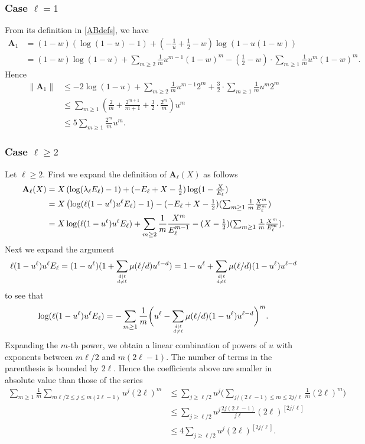 \documentclass[12pt]{amsart}
\theoremstyle{definition}
\numberwithin{equation}{section}
\newcommand{\bA}{\mathbf{A}}
\theoremstyle{definition} %
\theoremstyle{remark}
\begin{document}
\subsubsection*{Case $\ell=1$}
From its definition in \eqref{ABdefs}, we have 
\begin{align*}
\bA_1 
&=
(1-w)(\log(1-u) -1)
+(-\tfrac1u +\tfrac12 -w)\log(1-u(1-w))
\\&=
(1-w) \log(1-u)
+ \sum_{m\geq 2} \frac 1m u^{m-1}(1-w)^m
-(\tfrac 1 2-w) \cdot \sum_{m\geq 1} \frac 1m u^m (1-w)^m. 
\end{align*}
Hence
\begin{align*}
   \| \bA_1\| 
&\leq 
-2\log(1-u)
+ \sum_{m\geq 2} \frac 1m u^{m-1}2^m
+\frac32\cdot \sum_{m\geq 1} \frac 1m u^m 2^m  
\\
&\leq 
\sum_{m\geq 1}\left(\frac2m +\frac{2^{m+1}}{m+1}+ \frac32 \cdot \frac{2^m}{m}\right) u^m
\\&\leq
5\sum_{m\geq 1}\frac{2^m}{m} u^m.
\end{align*}

\subsubsection*{Case $\ell\geq 2$}
Let $\ell\geq 2$. 
First we expand the definition of $\mathbf{A}_\ell(X)$ as follows 
\begin{align}
\mathbf{A}_\ell(X) &=X\left(\log(\lambda_\ell E_\ell)-1 \right)+(-E_\ell+X-\textstyle{\frac 1 2} )\log(1-\textstyle{\frac X{E_\ell}})  \notag
\\&=
X\left(\log(\ell (1-u^\ell) u^\ell E_\ell)-1 \right)-(-E_\ell+X-\textstyle{\frac 1 2} )(\sum_{m\geq 1} \frac 1m \frac{X^m}{E_\ell^m} ) \notag
\\&=
X \log(\ell (1-u^\ell) u^\ell E_\ell)
+ \sum_{m\geq 2} \frac 1m \frac{X^m}{E_\ell^{m-1}}
-(X-\textstyle{\frac 1 2} )(\sum_{m\geq 1} \frac 1m \frac{X^m}{E_\ell^m} ). \label{al}
\end{align}
Next we expand the argument
\begin{equation} \label{arg}
    \ell (1-u^\ell) u^\ell E_\ell
    =
    (1-u^\ell)(1+\sum_{d\mid \ell\atop d\neq \ell} \mu(\ell/d) u^{\ell-d})
    =
    1-u^\ell +\sum_{d\mid \ell\atop d\neq \ell} \mu(\ell/d) (1-u^\ell)u^{\ell-d}
\end{equation}
to see that
\[
    \log(\ell (1-u^\ell) u^\ell E_\ell) 
    =
    -\sum_{m\geq 1} \frac1m \bigg(u^\ell -\sum_{d\mid \ell\atop d\neq \ell} \mu(\ell/d) (1-u^\ell)u^{\ell-d}\bigg)^m.
\]
Expanding the $m$-th power, we obtain a linear combination of powers of $u$ with exponents between $m\ell/2$ and $m(2\ell-1)$.
The number of terms in the parenthesis is bounded by $2\ell$. 
Hence the coefficients above are smaller in absolute value than those of the series 
\begin{align*}
    \sum_{m\geq 1} \frac1m 
    \sum_{m\ell/2\leq j \leq m(2\ell-1)} u^j (2\ell)^m 
    &\leq \sum_{j\geq \ell/2} u^j \bigg( \sum_{ j/(2\ell-1) \leq m \leq 2j/\ell } \frac1m (2\ell)^m \bigg) \\
    &\leq
    \sum_{j\geq \ell/2} u^j \frac{2j(2\ell-1)}{j\ell}(2\ell)^{[2j/\ell]} \\
    &\leq 4 \sum_{j\geq \ell/2} u^j(2\ell)^{[2j/\ell]}.
\end{align*} 
\end{document}
